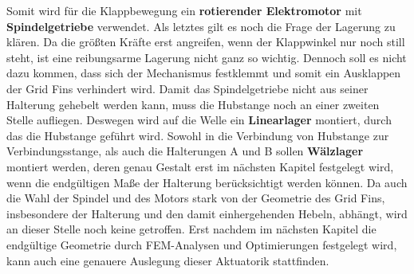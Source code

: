 Somit wird für die Klappbewegung ein \textbf{rotierender Elektromotor} mit \textbf{Spindelgetriebe} verwendet. Als letztes gilt es noch die Frage der Lagerung zu klären. Da die größten Kräfte erst angreifen, wenn der Klappwinkel nur noch still steht, ist eine reibungsarme Lagerung nicht ganz so wichtig. Dennoch soll es nicht dazu kommen, dass sich der Mechanismus festklemmt und somit ein Ausklappen der Grid Fins verhindert wird. Damit das Spindelgetriebe nicht aus seiner Halterung gehebelt werden kann, muss die Hubstange noch an einer zweiten Stelle aufliegen. Deswegen wird auf die Welle ein \textbf{Linearlager} montiert, durch das die Hubstange geführt wird. Sowohl in die Verbindung von Hubstange zur Verbindungsstange, als auch die Halterungen A und B sollen \textbf{Wälzlager} montiert werden, deren genau Gestalt erst im nächsten Kapitel festgelegt wird, wenn die endgültigen Maße der Halterung berücksichtigt werden können.
Da auch die Wahl der Spindel und des Motors stark von der Geometrie des Grid Fins, insbesondere der Halterung und den damit einhergehenden Hebeln, abhängt, wird an dieser Stelle noch keine getroffen. Erst nachdem im nächsten Kapitel die endgültige Geometrie durch FEM-Analysen und Optimierungen festgelegt wird, kann auch eine genauere Auslegung dieser Aktuatorik stattfinden.
